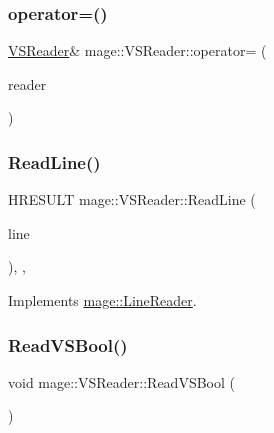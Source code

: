 \hypertarget{classmage_1_1_v_s_reader_a2be1e0645e3496f71c2f2b7fcf98ba2a}{}\label{classmage_1_1_v_s_reader_a2be1e0645e3496f71c2f2b7fcf98ba2a} 
\subsubsection{\texorpdfstring{operator=()}{operator=()}\hspace{0.1cm}{\footnotesize\ttfamily [2/2]}}
{\footnotesize\ttfamily \hyperlink{classmage_1_1_v_s_reader}{V\+S\+Reader}\& mage\+::\+V\+S\+Reader\+::operator= (\begin{DoxyParamCaption}\item[{\hyperlink{classmage_1_1_v_s_reader}{V\+S\+Reader} \&\&}]{reader }\end{DoxyParamCaption})\hspace{0.3cm}{\ttfamily [delete]}}

\hypertarget{classmage_1_1_v_s_reader_a63c6f6fa8ddb0f6a001e3969c5b19c1f}{}\label{classmage_1_1_v_s_reader_a63c6f6fa8ddb0f6a001e3969c5b19c1f} 
\subsubsection{\texorpdfstring{Read\+Line()}{ReadLine()}}
{\footnotesize\ttfamily H\+R\+E\+S\+U\+LT mage\+::\+V\+S\+Reader\+::\+Read\+Line (\begin{DoxyParamCaption}\item[{char $\ast$}]{line }\end{DoxyParamCaption})\hspace{0.3cm}{\ttfamily [override]}, {\ttfamily [private]}, {\ttfamily [virtual]}}



Implements \hyperlink{classmage_1_1_line_reader_a193ad5c9084eb87e8a98a3c1782d93ff}{mage\+::\+Line\+Reader}.

\hypertarget{classmage_1_1_v_s_reader_a579233b81762c064739a29ba1c140898}{}\label{classmage_1_1_v_s_reader_a579233b81762c064739a29ba1c140898} 
\subsubsection{\texorpdfstring{Read\+V\+S\+Bool()}{ReadVSBool()}}
{\footnotesize\ttfamily void mage\+::\+V\+S\+Reader\+::\+Read\+V\+S\+Bool (\begin{DoxyParamCaption}{ }\end{DoxyParamCaption})\hspace{0.3cm}{\ttfamily [private]}}

